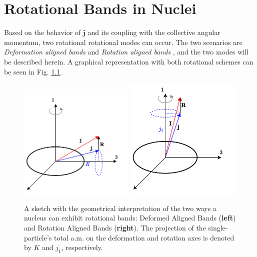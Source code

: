 \chapter{Rotational Bands in Nuclei}
\label{appendix:ral-dal-signature-scheme}

Based on the behavior of $\mathbf{j}$ and its coupling with the collective angular momentum, two rotational rotational modes can occur. The two scenarios are \emph{Deformation aligned bands} and \emph{Rotation aligned bands} \cite{uwitonze2015assignment}, and the two modes will be described herein. A graphical representation with both rotational schemes can be seen in Fig. \ref{ral-dal-coupling-bands}.
\begin{figure}
    \centering
    \includegraphics[width=0.49\textwidth]{Chapters/Figures/DAL_scheme.pdf}
    \includegraphics[width=0.49\textwidth]{Chapters/Figures/RAL_scheme.pdf}
    \caption{A sketch with the geometrical interpretation of the two ways a nucleus can exhibit rotational bands: Deformed Aligned Bands (\textbf{left}) and Rotation Aligned Bands (\textbf{right}). The projection of the single-particle's total a.m. on the deformation and rotation axes is denoted by $K$ and $j_1$, respectively.}
    \label{ral-dal-coupling-bands}
\end{figure}

